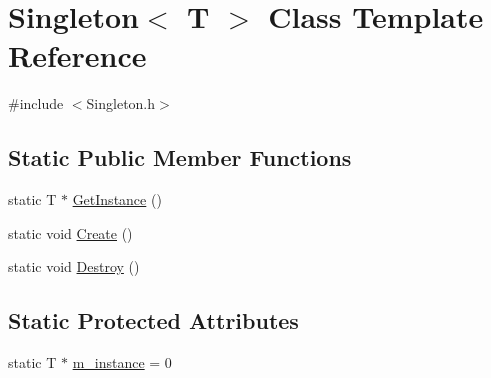 \hypertarget{class_singleton}{\section{Singleton$<$ T $>$ Class Template Reference}
\label{class_singleton}
}


{\ttfamily \#include $<$Singleton.\-h$>$}

\subsection*{Static Public Member Functions}
\begin{DoxyCompactItemize}
\item 
static T $\ast$ \hyperlink{class_singleton_a9460c2b31ff4dd9f7d022b0fff0afda4}{Get\-Instance} ()
\item 
static void \hyperlink{class_singleton_a3cf263c9304948f53b8a4e8082761930}{Create} ()
\item 
static void \hyperlink{class_singleton_a7058846441886b854787967b56c088dc}{Destroy} ()
\end{DoxyCompactItemize}
\subsection*{Static Protected Attributes}
\begin{DoxyCompactItemize}
\item 
static T $\ast$ \hyperlink{class_singleton_a77987e85742da3505825c3195ed7c8a6}{m\-\_\-instance} = 0
\end{DoxyCompactItemize}



